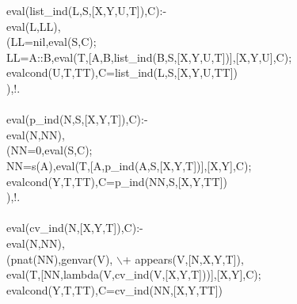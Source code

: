 \documentclass[11pt]{report}
\begin{document}
\begin{sf}
\begin{tabbing}
eval(list\_\hspace{0.1em}ind(L,S,[X,Y,U,T]),C):-\\[-0.15ex]
\hspace{1em}eval(L,LL),\\[-0.15ex]
\hspace{1em}(LL=nil,eval(S,C);\\[-0.15ex]
\hspace{2em}LL=A::B,eval(T,[A,B,list\_\hspace{0.1em}ind(B,S,[X,Y,U,T])],[X,Y,U],C);\\[-0.15ex]
\hspace{2em}evalcond(U,T,TT),C=list\_\hspace{0.1em}ind(L,S,[X,Y,U,TT])\\[-0.15ex]
\hspace{1em}),!.\\[-0.7ex]
\\[-0.15ex]
eval(p\_\hspace{0.1em}ind(N,S,[X,Y,T]),C):-\\[-0.15ex]
\hspace{1em}eval(N,NN),\\[-0.15ex]
\hspace{1em}(NN=0,eval(S,C);\\[-0.15ex]
\hspace{2em}NN=s(A),eval(T,[A,p\_\hspace{0.1em}ind(A,S,[X,Y,T])],[X,Y],C);\\[-0.15ex]
\hspace{2em}evalcond(Y,T,TT),C=p\_\hspace{0.1em}ind(NN,S,[X,Y,TT])\\[-0.15ex]
\hspace{1em}),!.\\[-0.7ex]
\\[-0.15ex]
eval(cv\_\hspace{0.1em}ind(N,[X,Y,T]),C):-\\[-0.15ex]
\hspace{1em}eval(N,NN),\\[-0.15ex]
\hspace{1em}(pnat(NN),genvar(V), $\backslash$+ appears(V,[N,X,Y,T]),\\[-0.15ex]
\hspace{2em}eval(T,[NN,lambda(V,cv\_\hspace{0.1em}ind(V,[X,Y,T]))],[X,Y],C);\\[-0.15ex]
\hspace{2em}evalcond(Y,T,TT),C=cv\_\hspace{0.1em}ind(NN,[X,Y,TT])\\[-0.15ex]

\end{tabbing}
\end{sf}
\end{document}
